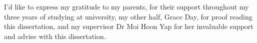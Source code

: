 I'd like to express my gratitude to my parents, for their support throughout my three years of studying at university, my other half, Grace Day, for proof reading this dissertation, and my supervisor Dr Moi Hoon Yap for her invaluable support and advise with this dissertation.